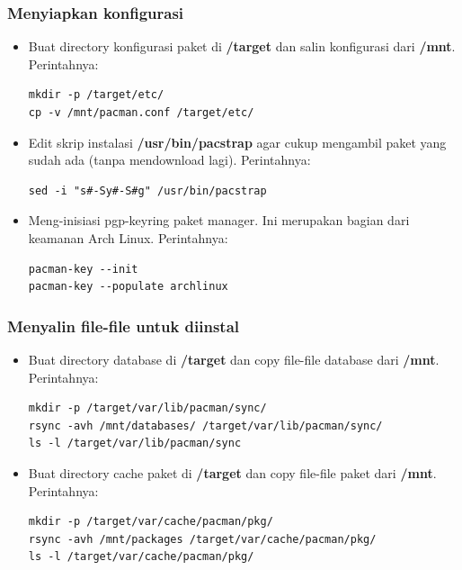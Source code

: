 \documentclass[12pt,]{article}
\begin{document}
	\subsubsection{Menyiapkan konfigurasi}
	\begin{itemize}
		\item Buat directory konfigurasi paket di \textbf{/target} dan salin konfigurasi dari \textbf{/mnt}.
		Perintahnya:
		\begin{verbatim}
mkdir -p /target/etc/
cp -v /mnt/pacman.conf /target/etc/	
		\end{verbatim}	
		
		\item Edit skrip instalasi \textbf{/usr/bin/pacstrap} agar cukup mengambil paket yang sudah ada (tanpa mendownload lagi).
		Perintahnya:
		\begin{verbatim}
sed -i "s#-Sy#-S#g" /usr/bin/pacstrap	
		\end{verbatim}
		
		\item Meng-inisiasi pgp-keyring paket manager. Ini merupakan bagian dari keamanan Arch Linux.
		Perintahnya:
		\begin{verbatim}
pacman-key --init
pacman-key --populate archlinux
		\end{verbatim}
	\end{itemize}
	
	\subsubsection{Menyalin file-file untuk diinstal}
	\begin{itemize}
	\item Buat directory database di \textbf{/target} dan copy file-file database dari \textbf{/mnt}.
		Perintahnya:
		\begin{verbatim}
mkdir -p /target/var/lib/pacman/sync/
rsync -avh /mnt/databases/ /target/var/lib/pacman/sync/
ls -l /target/var/lib/pacman/sync
		\end{verbatim}
		
		\item Buat directory cache paket di \textbf{/target} dan copy file-file paket dari \textbf{/mnt}.
		Perintahnya:
		\begin{verbatim}
mkdir -p /target/var/cache/pacman/pkg/
rsync -avh /mnt/packages /target/var/cache/pacman/pkg/
ls -l /target/var/cache/pacman/pkg/
		\end{verbatim}
	\end{itemize}
\end{document}
